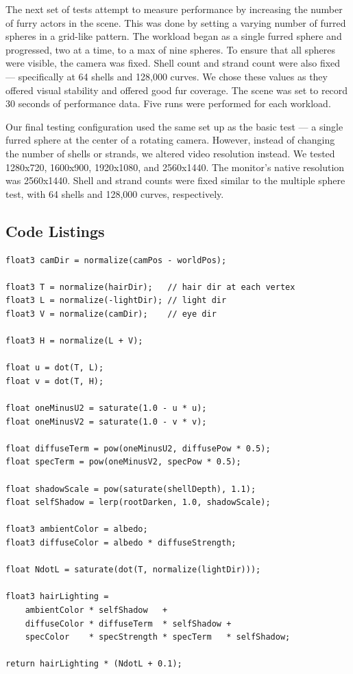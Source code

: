 \documentclass{article}
\begin{document}
The next set of tests attempt to measure performance by increasing the number of furry actors in the scene. This was done by setting a varying number of furred spheres in a grid-like pattern. The workload began as a single furred sphere and progressed, two at a time, to a max of nine spheres. To ensure that all spheres were visible, the camera was fixed. Shell count and strand count were also fixed --- specifically at 64 shells and 128,000 curves. We chose these values as they offered visual stability and offered good fur coverage. The scene was set to record 30 seconds of performance data. Five runs were performed for each workload.

Our final testing configuration used the same set up as the basic test --- a single furred sphere at the center of a rotating camera. However, instead of changing the number of shells or strands, we altered video resolution instead. We tested 1280x720, 1600x900, 1920x1080, and 2560x1440. The monitor's native resolution was 2560x1440. Shell and strand counts were fixed similar to the multiple sphere test, with 64 shells and 128,000 curves, respectively.

\subsection{Code Listings}

\begin{lstlisting}[caption=Shell Fur Material Lighting, label={lst:shell-lighting}]
float3 camDir = normalize(camPos - worldPos);

float3 T = normalize(hairDir);   // hair dir at each vertex
float3 L = normalize(-lightDir); // light dir
float3 V = normalize(camDir);    // eye dir

float3 H = normalize(L + V);

float u = dot(T, L);
float v = dot(T, H);

float oneMinusU2 = saturate(1.0 - u * u);
float oneMinusV2 = saturate(1.0 - v * v);

float diffuseTerm = pow(oneMinusU2, diffusePow * 0.5);
float specTerm = pow(oneMinusV2, specPow * 0.5);

float shadowScale = pow(saturate(shellDepth), 1.1);
float selfShadow = lerp(rootDarken, 1.0, shadowScale);

float3 ambientColor = albedo;
float3 diffuseColor = albedo * diffuseStrength;

float NdotL = saturate(dot(T, normalize(lightDir)));

float3 hairLighting =
    ambientColor * selfShadow   +
    diffuseColor * diffuseTerm  * selfShadow +
    specColor    * specStrength * specTerm   * selfShadow;

return hairLighting * (NdotL + 0.1);
\end{lstlisting}
\end{document}
